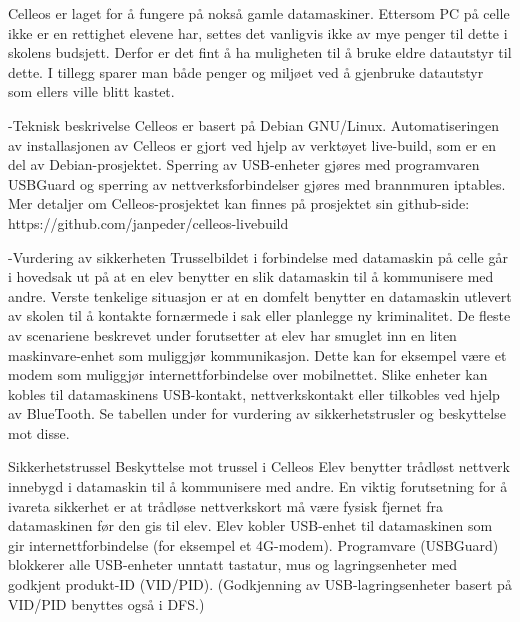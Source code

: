 Celleos er laget for å fungere på nokså gamle datamaskiner. Ettersom PC på celle ikke er en rettighet elevene har, settes det vanligvis ikke av mye penger til dette i skolens budsjett. Derfor er det fint å ha muligheten til å bruke eldre datautstyr til dette. I tillegg sparer man både penger og miljøet ved å gjenbruke datautstyr som ellers ville blitt kastet.

-Teknisk beskrivelse
Celleos er basert på Debian GNU/Linux. Automatiseringen av installasjonen av Celleos er gjort ved hjelp av verktøyet live-build, som er en del av Debian-prosjektet. Sperring av USB-enheter gjøres med programvaren USBGuard og sperring av nettverksforbindelser gjøres med brannmuren iptables. Mer detaljer om Celleos-prosjektet kan finnes på prosjektet sin github-side:
https://github.com/janpeder/celleos-livebuild

-Vurdering av sikkerheten
Trusselbildet i forbindelse med datamaskin på celle går i hovedsak ut på at en elev benytter en slik datamaskin til å kommunisere med andre. Verste tenkelige situasjon er at en domfelt benytter en datamaskin utlevert av skolen til å kontakte fornærmede i sak eller planlegge ny kriminalitet.
De fleste av scenariene beskrevet under forutsetter at elev har smuglet inn en liten maskinvare-enhet som muliggjør kommunikasjon. Dette kan for eksempel være et modem som muliggjør internettforbindelse over mobilnettet. Slike enheter kan kobles til datamaskinens USB-kontakt, nettverkskontakt eller tilkobles ved hjelp av BlueTooth.
Se tabellen under for vurdering av sikkerhetstrusler og beskyttelse mot disse.

Sikkerhetstrussel	Beskyttelse mot trussel i Celleos
Elev benytter trådløst nettverk innebygd i datamaskin til å kommunisere med andre.	En viktig forutsetning for å ivareta sikkerhet er at trådløse nettverkskort må være fysisk fjernet fra datamaskinen før den gis til elev.
Elev kobler USB-enhet til datamaskinen som gir internettforbindelse (for eksempel et 4G-modem).	Programvare (USBGuard) blokkerer alle USB-enheter unntatt tastatur, mus og lagringsenheter med godkjent produkt-ID (VID/PID). (Godkjenning av USB-lagringsenheter basert på VID/PID benyttes også i DFS.)

